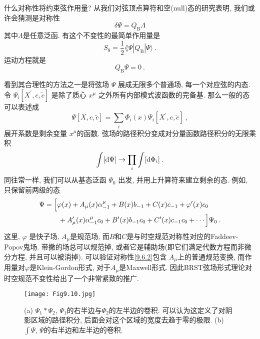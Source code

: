什么对称性将约束弦作用量? 从我们对弦顶点算符和空(null)态的研究表明, 我们或许会猜测是对称性
\begin{equation}
	\delta \Psi=Q_{\mathrm{B}} \Lambda \label{9.6.2}
\end{equation}
其中$\Lambda$是任意泛函. 有这个不变性的最简单作用量是
\begin{equation}
	S_{0}=\frac{1}{2}\lAngle\Psi |Q_{\mathrm{B}}| \Psi\rangle \:. \label{9.6.3}
\end{equation}
运动方程就是
\begin{equation}
	Q_{\mathrm{B}} \Psi=0 \:. \label{9.6.4}
\end{equation}

看到其合理性的方法之一是将弦场 $\Psi$ 展成无限多个普通场, 每一个对应弦的内态. 
令 $\Psi_{i}[X^{\prime}, c, \tilde{c}]$ 是除了质心 $x^{\mu} $ 之外所有内部模式波函数的完备基. 那么一般的态可以表述成
\begin{equation}
	\Psi[X, c, \tilde{c}]=\sum_{i} \Phi_{i}(x) \Psi_{i}[X^{\prime}, c, \tilde{c}] \:, \label{9.6.5}
\end{equation}
展开系数是剩余变量 $x^{\mu}$的函数. 弦场的路径积分变成对分量函数路径积分的无限乘积
\begin{equation}
	\int[\mathrm{d} \Psi] \rightarrow \prod_{i} \int[\mathrm{d} \Phi_{i}] \:. \label{9.6.6}
\end{equation}
同往常一样, 我们可以从基态泛函 $\Psi_{0}$ 出发, 并用上升算符来建立剩余的态. 例如, 只保留前两级的态
\begin{align}
	\Psi &= \Bigl[\varphi(x) + A_{\mu}(x) \alpha_{-1}^{\mu} + B(x) b_{-1} + C(x) c_{-1} + \varphi^{\prime}(x) c_{0}\nonumber \\
	&\qquad+A_{\mu}^{\prime}(x) \alpha_{-1}^{\mu} c_{0} + B^{\prime}(x) b_{-1} c_{0} + C^{\prime}(x) c_{-1} c_{0} + \cdots\Bigr] 
	\Psi_{0} \:. \label{9.6.7}
\end{align}
这里, $\varphi$ 是快子场, $A_{\mu}$是规范场, 而$B$和$C$是与时空规范对称性对应的Faddeev-Popov鬼场. 
带撇的场总可以规范掉, 或者它是辅助场(即它们满足代数方程而非微分方程, 并且可以被消掉). 
可以验证对称性\eqref{9.6.2}包含 $A_{\mu}$上的普通规范变换, 而作用量对$\varphi$是Klein-Gordon形式, 对于$A_{\mu} $是Maxwell形式. 
因此BRST弦场形式理论对时空规范不变性给出了一个非常紧致的推广.


\begin{figure}[h!]
	\begin{center}
		\texttt{[image: Fig9.10.jpg]}
		\caption{(a) $\Psi_{1} * \Psi_{2}$, $\Psi_{1}$的右半边与$\Psi_{2}$的左半边的卷积. 可以认为这定义了对阴影区域的路径积分, 后面会对这个区域的宽度去趋于零的极限. (b) $\int \Psi$, $\Psi$的右半边和左半边的卷积.}\label{Fig9.10}
	\end{center}
\end{figure}
\vspace*{-0.7cm}

